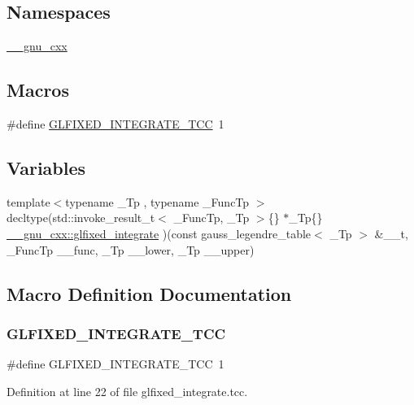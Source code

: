 \subsection*{Namespaces}
\begin{DoxyCompactItemize}
\item 
 \hyperlink{namespace____gnu__cxx}{\+\_\+\+\_\+gnu\+\_\+cxx}
\end{DoxyCompactItemize}
\subsection*{Macros}
\begin{DoxyCompactItemize}
\item 
\#define \hyperlink{glfixed__integrate_8tcc_a59b18c28cc328f58f042a33acd5d46aa}{G\+L\+F\+I\+X\+E\+D\+\_\+\+I\+N\+T\+E\+G\+R\+A\+T\+E\+\_\+\+T\+CC}~1
\end{DoxyCompactItemize}
\subsection*{Variables}
\begin{DoxyCompactItemize}
\item 
{\footnotesize template$<$typename \+\_\+\+Tp , typename \+\_\+\+Func\+Tp $>$ }\\decltype(std\+::invoke\+\_\+result\+\_\+t$<$ \+\_\+\+Func\+Tp, \+\_\+\+Tp $>$\{\} $\ast$\+\_\+\+Tp\{\} \hyperlink{namespace____gnu__cxx_a5fca3754ea9feb1fb2448da7df080ef6}{\+\_\+\+\_\+gnu\+\_\+cxx\+::glfixed\+\_\+integrate} )(const gauss\+\_\+legendre\+\_\+table$<$ \+\_\+\+Tp $>$ \&\+\_\+\+\_\+t, \+\_\+\+Func\+Tp \+\_\+\+\_\+func, \+\_\+\+Tp \+\_\+\+\_\+lower, \+\_\+\+Tp \+\_\+\+\_\+upper)
\end{DoxyCompactItemize}


\subsection{Macro Definition Documentation}
\mbox{\label{glfixed__integrate_8tcc_a59b18c28cc328f58f042a33acd5d46aa}} 
\subsubsection{\texorpdfstring{G\+L\+F\+I\+X\+E\+D\+\_\+\+I\+N\+T\+E\+G\+R\+A\+T\+E\+\_\+\+T\+CC}{GLFIXED\_INTEGRATE\_TCC}}
{\footnotesize\ttfamily \#define G\+L\+F\+I\+X\+E\+D\+\_\+\+I\+N\+T\+E\+G\+R\+A\+T\+E\+\_\+\+T\+CC~1}



Definition at line 22 of file glfixed\+\_\+integrate.\+tcc.

